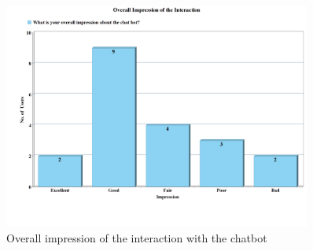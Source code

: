 \begin{figure}[!h]
    \centering
    \includegraphics[width=0.9\textwidth]{img/Overall_Impression_Updated_2.PNG}
    \caption{Overall impression of the interaction with the chatbot}
    \label{fig:overallImpre}
\end{figure}

